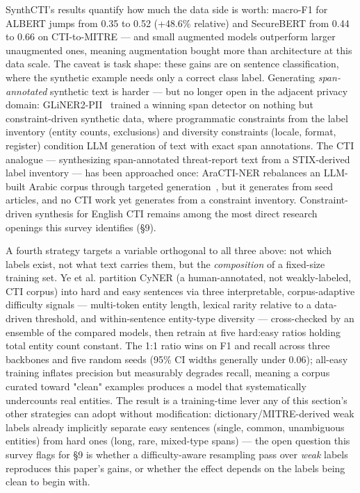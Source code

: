 \documentclass[11pt]{article}
\begin{document}
SynthCTI's results quantify how much the data side is worth: macro-F1 for ALBERT jumps from 0.35 to 0.52 (+48.6\% relative) and SecureBERT from 0.44 to 0.66 on CTI-to-MITRE — and small augmented models outperform larger unaugmented ones, meaning augmentation bought more than architecture at this data scale. The caveat is task shape: these gains are on sentence classification, where the synthetic example needs only a correct class label. Generating \emph{span-annotated} synthetic text is harder — but no longer open in the adjacent privacy domain: GLiNER2-PII~\citep{zaratiana2026gliner2pii} trained a winning span detector on nothing but constraint-driven synthetic data, where programmatic constraints from the label inventory (entity counts, exclusions) and diversity constraints (locale, format, register) condition LLM generation of text with exact span annotations. The CTI analogue — synthesizing span-annotated threat-report text from a STIX-derived label inventory — has been approached once: AraCTI-NER rebalances an LLM-built Arabic corpus through targeted generation~\citep{alghamdi2026aracti}, but it generates from seed articles, and no CTI work yet generates from a constraint inventory. Constraint-driven synthesis for English CTI remains among the most direct research openings this survey identifies (§9).

A fourth strategy targets a variable orthogonal to all three above: not which labels exist, not what text carries them, but the \emph{composition} of a fixed-size training set. Ye et al. partition CyNER (a human-annotated, not weakly-labeled, CTI corpus) into hard and easy sentences via three interpretable, corpus-adaptive difficulty signals — multi-token entity length, lexical rarity relative to a data-driven threshold, and within-sentence entity-type diversity — cross-checked by an ensemble of the compared models, then retrain at five hard:easy ratios holding total entity count constant. The 1:1 ratio wins on F1 and recall across three backbones and five random seeds (95\% CI widths generally under 0.06); all-easy training inflates precision but measurably degrades recall, meaning a corpus curated toward "clean" examples produces a model that systematically undercounts real entities. The result is a training-time lever any of this section's other strategies can adopt without modification: dictionary/MITRE-derived weak labels already implicitly separate easy sentences (single, common, unambiguous entities) from hard ones (long, rare, mixed-type spans) — the open question this survey flags for §9 is whether a difficulty-aware resampling pass over \emph{weak} labels reproduces this paper's gains, or whether the effect depends on the labels being clean to begin with.
\end{document}
